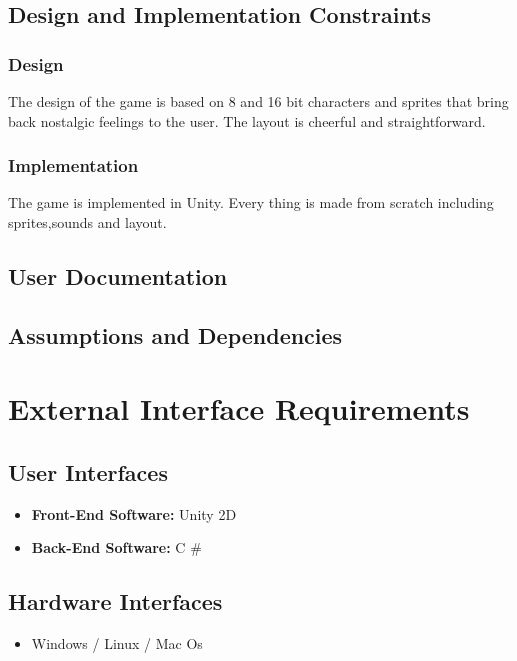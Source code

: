 \section{Design and Implementation Constraints}
\subsection {Design}
The design of the game is based on 8 and 16 bit characters and sprites that bring back nostalgic feelings to the user. The layout is cheerful and straightforward.
\subsection{Implementation}
The game is implemented in Unity. Every thing is made from scratch including sprites,sounds and layout.
\section{User Documentation}

\section{Assumptions and Dependencies}

\newpage




\chapter{External Interface Requirements}
\label{External Interface Requirements}

\section{User Interfaces}

\begin{itemize}
    \item \textbf{Front-End Software:} Unity 2D
    \item \textbf{Back-End Software:} C \#
\end{itemize}

\section{Hardware Interfaces}
\begin{itemize}
    \item Windows / Linux / Mac Os
\end{itemize}

